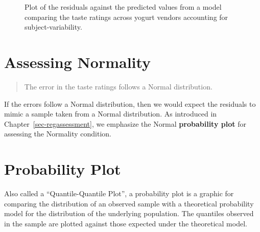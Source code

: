 \documentclass[
  letterpaper,
  DIV=11,
  numbers=noendperiod]{scrreprt}
\theoremstyle{plain}
\theoremstyle{definition}
\theoremstyle{definition}
\theoremstyle{remark}
\begin{document}
\begin{figure}


\caption{\label{fig-blockassessment-variance-yogurt}Plot of the
residuals against the predicted values from a model comparing the taste
ratings across yogurt vendors accounting for subject-variability.}

\end{figure}%

\section{Assessing Normality}\label{assessing-normality-2}

\begin{quote}
The error in the taste ratings follows a Normal distribution.
\end{quote}

If the errors follow a Normal distribution, then we would expect the
residuals to mimic a sample taken from a Normal distribution. As
introduced in Chapter~\ref{sec-regassessment}, we emphasize the Normal
\textbf{probability plot} for assessing the Normality condition.

\section{Probability Plot}\label{probability-plot-2}

Also called a ``Quantile-Quantile Plot'', a probability plot is a
graphic for comparing the distribution of an observed sample with a
theoretical probability model for the distribution of the underlying
population. The quantiles observed in the sample are plotted against
those expected under the theoretical model.
\end{document}

